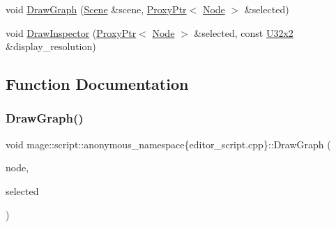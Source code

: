 \begin{DoxyCompactItemize}
\item 
void \mbox{\hyperlink{namespacemage_1_1script_1_1anonymous__namespace_02editor__script_8cpp_03_acfa5e5aa3ba0f36f5647ba6ba6c2a222}{Draw\+Graph}} (\mbox{\hyperlink{classmage_1_1_scene}{Scene}} \&scene, \mbox{\hyperlink{classmage_1_1_proxy_ptr}{Proxy\+Ptr}}$<$ \mbox{\hyperlink{classmage_1_1_node}{Node}} $>$ \&selected)
\item 
void \mbox{\hyperlink{namespacemage_1_1script_1_1anonymous__namespace_02editor__script_8cpp_03_a37f3c01e5f19bd2d536d7caa82c3d3ed}{Draw\+Inspector}} (\mbox{\hyperlink{classmage_1_1_proxy_ptr}{Proxy\+Ptr}}$<$ \mbox{\hyperlink{classmage_1_1_node}{Node}} $>$ \&selected, const \mbox{\hyperlink{namespacemage_a31f2bb52b5080e706e1c13de07c0a249}{U32x2}} \&display\+\_\+resolution)
\end{DoxyCompactItemize}


\subsection{Function Documentation}
\mbox{\label{namespacemage_1_1script_1_1anonymous__namespace_02editor__script_8cpp_03_a0e1c1d61b369a6c6eee68380890d5217}} 
\subsubsection{\texorpdfstring{Draw\+Graph()}{DrawGraph()}\hspace{0.1cm}{\footnotesize\ttfamily [1/2]}}
{\footnotesize\ttfamily void mage\+::script\+::anonymous\+\_\+namespace\{editor\+\_\+script.\+cpp\}\+::Draw\+Graph (\begin{DoxyParamCaption}\item[{\mbox{\hyperlink{classmage_1_1_node}{Node}} \&}]{node,  }\item[{\mbox{\hyperlink{classmage_1_1_proxy_ptr}{Proxy\+Ptr}}$<$ \mbox{\hyperlink{classmage_1_1_node}{Node}} $>$ \&}]{selected }\end{DoxyParamCaption})}

